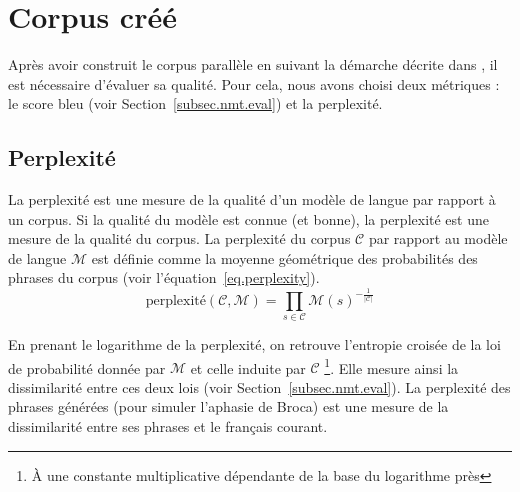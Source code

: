 \section{Corpus créé}%
\label{sec.results.corpus}

Après avoir construit le corpus parallèle en suivant la démarche décrite dans 
,
il est nécessaire d'évaluer sa qualité.
Pour cela, nous avons choisi deux métriques : le score \gls{bleu} (voir Section~\ref{subsec.nmt.eval})
et la perplexité.

\subsection{Perplexité}%
\label{subsec.results.corpus.perplexity}

La perplexité est une mesure de la qualité d'un modèle de langue par rapport à un corpus.
Si la qualité du modèle est connue (et bonne), la perplexité est une mesure de la qualité du corpus.
La perplexité du corpus \(\mathcal{C}\) par rapport au modèle de langue \(\mathcal{M}\) est définie
comme la moyenne géométrique des probabilités des phrases du corpus (voir l'équation~\ref{eq.perplexity}).
\begin{equation}
  \label{eq.perplexity}
  \text{perplexité}(\mathcal{C}, \mathcal{M}) = 
  \prod_{s\in\mathcal{C}}\mathcal{M}(s)^{-\frac{1}{|\mathcal{C}|}}
\end{equation}

En prenant le logarithme de la perplexité, 
on retrouve l'entropie croisée de la loi de probabilité donnée par \(\mathcal{M}\) 
et celle induite par \(\mathcal{C}\)%
\footnote{À une constante multiplicative dépendante de la base du logarithme près}.
Elle mesure ainsi la dissimilarité entre ces deux lois (voir Section~\ref{subsec.nmt.eval}).
La perplexité des phrases générées (pour simuler l'aphasie de Broca) 
est une mesure de la dissimilarité entre ses phrases et le français courant.


